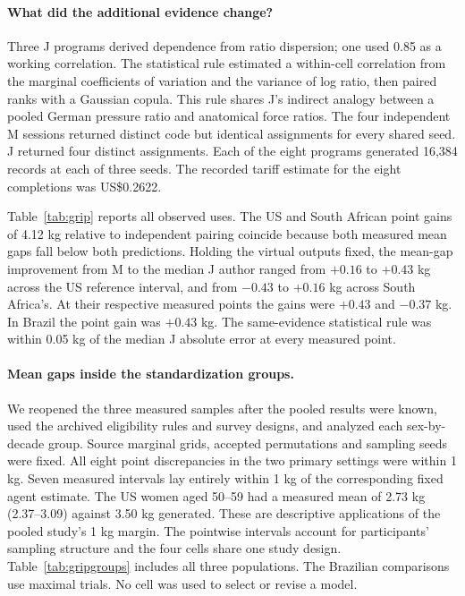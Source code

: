 \paragraph{What did the additional evidence change?}
Three J programs derived dependence from ratio dispersion; one used 0.85 as a working correlation. The statistical rule estimated a within-cell correlation from the marginal coefficients of variation and the variance of log ratio, then paired ranks with a Gaussian copula. This rule shares J's indirect analogy between a pooled German pressure ratio and anatomical force ratios. The four independent M sessions returned distinct code but identical assignments for every shared seed. J returned four distinct assignments. Each of the eight programs generated 16,384 records at each of three seeds. The recorded tariff estimate for the eight completions was US\$0.2622.

Table~\ref{tab:grip} reports all observed uses. The US and South African point gains of 4.12 kg relative to independent pairing coincide because both measured mean gaps fall below both predictions. Holding the virtual outputs fixed, the mean-gap improvement from M to the median J author ranged from $+0.16$ to $+0.43$ kg across the US reference interval, and from $-0.43$ to $+0.16$ kg across South Africa's. At their respective measured points the gains were $+0.43$ and $-0.37$ kg. In Brazil the point gain was $+0.43$ kg. The same-evidence statistical rule was within 0.05 kg of the median J absolute error at every measured point.

\paragraph{Mean gaps inside the standardization groups.}
We reopened the three measured samples after the pooled results were known, used the archived eligibility rules and survey designs, and analyzed each sex-by-decade group. Source marginal grids, accepted permutations and sampling seeds were fixed. All eight point discrepancies in the two primary settings were within 1 kg. Seven measured intervals lay entirely within 1 kg of the corresponding fixed agent estimate. The US women aged 50--59 had a measured mean of 2.73 kg (2.37--3.09) against 3.50 kg generated. These are descriptive applications of the pooled study's 1 kg margin. The pointwise intervals account for participants' sampling structure and the four cells share one study design. Table~\ref{tab:gripgroups} includes all three populations. The Brazilian comparisons use maximal trials. No cell was used to select or revise a model.

